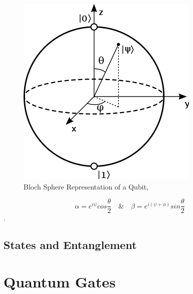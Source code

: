 \begin{figure}[!htb]
\centering
  \includegraphics[scale=0.5]{bloch}
  \caption{Bloch Sphere Representation of a Qubit,}
\end{figure}

\[\alpha =  e^{i\psi}cos\dfrac{\theta}{2} \quad \& \quad \beta = e^{i(\psi + \phi)}sin\dfrac{\theta}{2} \].

\subsection{States and Entanglement}
\section{Quantum Gates}